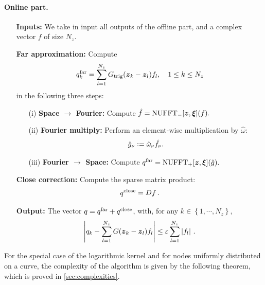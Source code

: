 \documentclass[main]{subfiles}
\begin{document}
\paragraph{Online part.}
\begin{itemize}
	\item[] \textbf{Inputs:} We take in input all outputs of the offline part, and a complex vector $f$ of size $N_z$. 
	\item[] \textbf{Far approximation:} Compute
	\begin{equation}
	\label{FarApprox}
	q^{\text{far}}_k = \sum_{l=1}^{N_z} G_{\textup{trig}}(\boldsymbol{z}_k - \boldsymbol{z}_l) f_l, \quad 1 \leq k \leq N_z
	\end{equation} 
	in the following three steps:
	\begin{itemize}
		\setlength{\itemindent}{2em}
		\item[(i)] \textbf{Space $\rightarrow$ Fourier: } Compute $\hat{f} = \textup{NUFFT}_-[\boldsymbol{z},\boldsymbol{\xi}](f).$
		\item[(ii)] \textbf{Fourier multiply:} Perform an element-wise multiplication by $\hat{\omega}$:
		\[{\hat{g}_{\nu} \mathrel{\mathop:}= \hat{\omega}_\nu \hat{f_\nu}.}\]
		\item[(iii)] \textbf{Fourier $\rightarrow$ Space: } Compute $q^{\text{far}} =  \textup{NUFFT}_+[\boldsymbol{z},\boldsymbol{\xi}](\hat{g}).$
		\setlength{\itemindent}{0em}
	\end{itemize}
	
	\item[] \textbf{Close correction:} Compute the sparse matrix product:
	\[q^{\textup{close}} = Df \,.\]
	\item[] \textbf{Output:} The vector $q = q^{\textup{far}} + q^{\textup{close}}$, with, for any $k \in \left\{1,\cdots,N_z\right\},$	
	\[ \left\lvert q_k - \sum_{l = 1}^{N_z} G({\boldsymbol{z}_k - \boldsymbol{z}_l}) f_l \right\rvert \leq \varepsilon \sum_{l=1}^{N_z} \left\lvert f_l \right\rvert\,.\]
\end{itemize}
For the special case of the logarithmic kernel and for nodes uniformly distributed on a curve, the complexity of the algorithm is given by the following theorem, which is proved in \autoref{sec:complexities}.
\end{document}
